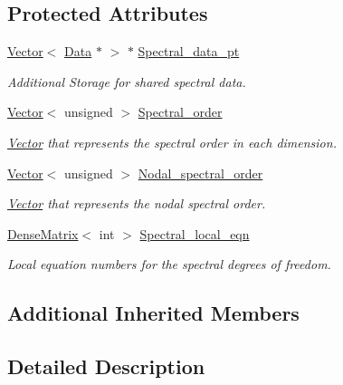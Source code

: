 \subsection*{Protected Attributes}
\begin{DoxyCompactItemize}
\item 
\hyperlink{classoomph_1_1Vector}{Vector}$<$ \hyperlink{classoomph_1_1Data}{Data} $\ast$ $>$ $\ast$ \hyperlink{classoomph_1_1SpectralElement_a14f6bf98b6c49bd939d3ca9d25373b9c}{Spectral\+\_\+data\+\_\+pt}
\begin{DoxyCompactList}\small\item\em Additional Storage for shared spectral data. \end{DoxyCompactList}\item 
\hyperlink{classoomph_1_1Vector}{Vector}$<$ unsigned $>$ \hyperlink{classoomph_1_1SpectralElement_ae9c3930a2471ee0298dcd088380c8d03}{Spectral\+\_\+order}
\begin{DoxyCompactList}\small\item\em \hyperlink{classoomph_1_1Vector}{Vector} that represents the spectral order in each dimension. \end{DoxyCompactList}\item 
\hyperlink{classoomph_1_1Vector}{Vector}$<$ unsigned $>$ \hyperlink{classoomph_1_1SpectralElement_ad4be04e6b166472ca5f18d4678884994}{Nodal\+\_\+spectral\+\_\+order}
\begin{DoxyCompactList}\small\item\em \hyperlink{classoomph_1_1Vector}{Vector} that represents the nodal spectral order. \end{DoxyCompactList}\item 
\hyperlink{classoomph_1_1DenseMatrix}{Dense\+Matrix}$<$ int $>$ \hyperlink{classoomph_1_1SpectralElement_a24c7cd3b63fa81f059c959baa5e66f79}{Spectral\+\_\+local\+\_\+eqn}
\begin{DoxyCompactList}\small\item\em Local equation numbers for the spectral degrees of freedom. \end{DoxyCompactList}\end{DoxyCompactItemize}
\subsection*{Additional Inherited Members}


\subsection{Detailed Description}


